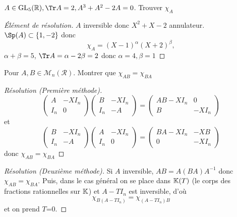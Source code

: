 \begin{exo}
    $A\in\mathrm{GL}_5(\R), \Tr A=2, A^3+A^2-2A=0$. Trouver $\chi_A$
\end{exo}

\begin{proof}[Élément de résolution]
    $A$ inversible donc $X^2+X-2$ annulateur. $\Sp(A)\subset \{1, -2\}$ donc \[\chi_A=(X-1)^\alpha(X+2)^\beta,\] $\alpha+\beta=5$, $\Tr A=\alpha-2\beta=2$ donc $\alpha=4, \beta=1$
\end{proof}

\begin{exo}
    Pour $A, B\in\mathcal M_n(\mathcal R)$. Montrer que $\chi_{AB}=\chi_{BA}$
\end{exo}

\begin{proof}[Résolution (Première méthode)]
    \[
        \begin{pmatrix}
            A & -XI_n \\ I_n & 0
        \end{pmatrix} \begin{pmatrix}
            B & -XI_n \\ I_n & -A
        \end{pmatrix}= \begin{pmatrix}
            AB-XI_n & 0 \\ B & -XI_n
        \end{pmatrix}
    \]
    et \[
        \begin{pmatrix}
            B & -XI_n \\ I_n & -A
        \end{pmatrix} \begin{pmatrix}
            A & -XI_n \\ I_n & 0
        \end{pmatrix} = \begin{pmatrix}
            BA-XI_n & -XB \\ 0 & -XI_n
        \end{pmatrix}
    \]
    donc $\chi_{AB}=\chi_{BA}$
\end{proof}

\begin{proof}[Résolution (Deuxième méthode)]
    Si $A$ inversible, $AB=A(BA)A^{-1}$ donc $\chi_{AB}=\chi_{BA}$. Puis, dans le cas général on se place dans $\mathbb K(T)$ (le corps des fractions rationnelles sur $\mathbb K$) et $A-TI_n$ est inversible, d'où \[
        \chi_{B(A-TI_n)}=\chi_{(A-TI_n)B}
    \]
    et on prend $T$=0.
\end{proof}

